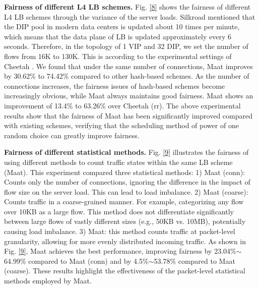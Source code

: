  \textbf{Fairness of different L4 LB schemes.} Fig. \ref{8} shows the fairness of different L4 LB schemes through the variance of the server loads. Silkroad \cite{miao2017silkroad} mentioned that the DIP pool in modern data centers is updated about 10 times per minute, which means that the data plane of LB is updated approximately every 6 seconds. Therefore, in the topology of 1 VIP and 32 DIP, we set the number of flows from 16K to 130K. This is according to the experimental settings of Cheetah \cite{barbette2021cheetah}. We found that under the same number of connections, Maat improves by 30.62\% to 74.42\% compared to other hash-based schemes. As the number of connections increases, the fairness issues of hash-based schemes become increasingly obvious, while Maat always maintains good fairness. Maat shows an improvement of 13.4\% to 63.26\% over Cheetah (rr). The above experimental results show that the fairness of Maat has been significantly improved compared with existing schemes, verifying that the scheduling method of power of one random choice can greatly improve fairness.
 
 \textbf{Fairness of different statistical methods.} Fig. \ref{9} illustrates the fairness of using different methods to count traffic states within the same LB scheme (Maat). This experiment compared three statistical methods: 1) Maat (conn): Counts only the number of connections, ignoring the difference in the impact of flow size on the server load. This can lead to load imbalance. 2) Maat (coarse): Counts traffic in a coarse-grained manner. For example, categorizing any flow over 10KB as a large flow. This method does not differentiate significantly between large flows of vastly different sizes (e.g., 50KB vs. 10MB), potentially causing load imbalance. 3) Maat: this method counts traffic at packet-level granularity, allowing for more evenly distributed incoming traffic. As shown in Fig. \ref{9}, Maat achieves the best performance, improving fairness by 23.04\%$\sim$64.99\% compared to Maat (conn) and by 4.5\%$\sim$53.78\% compared to Maat (coarse). These results highlight the effectiveness of the packet-level statistical methods employed by Maat.
 
